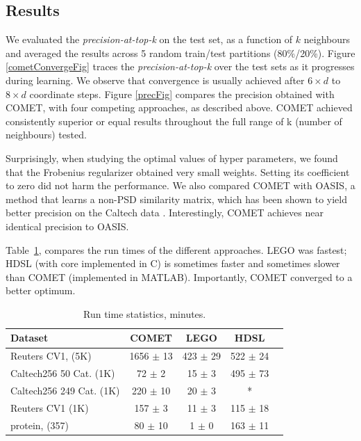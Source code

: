 \documentclass{article} %
\newcommand{\tabref}[1]{Table~\ref{#1}}
\begin{document}
\subsection{Results}
 We evaluated the \textit{precision-at-top-k} on the test set, as a function of $k$ neighbours and averaged the results across 5 random train/test partitions (80\%/20\%).
Figure \ref{cometConvergeFig} traces the \textit{precision-at-top-k} over the test sets as it progresses during learning. We observe that convergence is usually achieved after $6\times d$ to $8 \times d$ coordinate steps.
Figure \ref{precFig} compares the precision obtained with COMET, with four competing approaches, as described above. COMET achieved consistently superior or equal results throughout the full range of k (number of neighbours) tested. 

Surprisingly, when studying the optimal values of hyper parameters, we found that the Frobenius regularizer obtained very small weights. Setting its coefficient to zero did not harm the performance. We also compared COMET with OASIS, a method that learns a non-PSD similarity matrix, which has been shown to yield better precision on the Caltech data \cite{OASIS}. Interestingly, COMET achieves near identical precision to OASIS. 

\tabref{runtimes}, compares the run times of the different approaches. LEGO was fastest; HDSL (with core implemented in C) is sometimes faster and sometimes slower than COMET (implemented in MATLAB). Importantly, COMET converged to a better optimum.

\begin{table}[t]
\caption{Run time statistics, minutes.}
\label{runtimes}
\vskip 0.15in
\begin{center}
\begin{small}
\begin{sc}
\begin{tabular}{lcccr}
\hline
Dataset     & COMET           & LEGO            & HDSL             \\ 
\hline
Reuters CV1, (5K)&  1656 $\pm$    13 &   423 $\pm$    29 &   522 $\pm$    24  \\ 
Caltech256 50 Cat. (1K)  &    72 $\pm$     2 &    15 $\pm$     3 &   495 $\pm$    73  \\ 
Caltech256 249 Cat. (1K) &   220 $\pm$    10 &    20 $\pm$     3 &        *        \\
Reuters CV1 (1K) &   157 $\pm$     3 &    11 $\pm$     3 &   115 $\pm$    18  \\ 
protein, (357)  &    80 $\pm$    10 &     1 $\pm$     0 &   163 $\pm$    11 \\ 
\hline
\end{tabular}
\end{sc}
\end{small}
\end{center}
\vskip -0.1in
\end{table}
\end{document}
